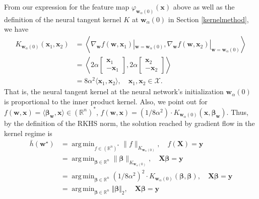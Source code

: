 \documentclass{article}
\DeclareMathOperator*{\argmin}{arg\,min}
\begin{document}
From our expression for the feature map $\varphi_{\boldsymbol{w}_{\alpha}(0)}(\boldsymbol{x})$ above as well as the definition of the neural tangent kernel $K$ at $\boldsymbol{w}_{\alpha}(0)$ in Section \ref{kernelmethod}, we have
\begin{align*}
K_{\boldsymbol{w}_{\alpha}(0)}(\boldsymbol{x}_1, \boldsymbol{x}_2) &= \left\langle \nabla_{\boldsymbol{w}}f(\boldsymbol{w}, \boldsymbol{x}_1)|_{\boldsymbol{w} = \boldsymbol{w}_{\alpha}(0)}, \nabla_{\boldsymbol{w}}f(\boldsymbol{w}, \boldsymbol{x}_2)|_{\boldsymbol{w} = \boldsymbol{w}_{\alpha}(0)} \right\rangle\\
&= \left\langle 2\alpha 
    \begin{bmatrix}
        \boldsymbol{x}_1\\
        -\boldsymbol{x}_1
    \end{bmatrix}, 2\alpha 
    \begin{bmatrix}
        \boldsymbol{x}_2\\
        -\boldsymbol{x}_2
    \end{bmatrix} \right\rangle\\
&= 8\alpha^2 \langle \boldsymbol{x}_1, \boldsymbol{x}_2 \rangle, \quad \boldsymbol{x}_1, \boldsymbol{x}_2 \in \mathcal{X}.
\end{align*}
That is, the neural tangent kernel at the neural network's initialization $\boldsymbol{w}_{\alpha}(0)$ is proportional to the inner product kernel. Also, we point out for $f(\boldsymbol{w}, \boldsymbol{x}) = \langle \boldsymbol{\beta}_{\boldsymbol{w}}, \boldsymbol{x} \rangle \in (\mathbb{R}^n)^*$, $f(\boldsymbol{w}, \boldsymbol{x}) =  (1/8\alpha^2)\cdot K_{\boldsymbol{w}_{\alpha}(0)}(\boldsymbol{x},\boldsymbol{\beta}_{\boldsymbol{w}})$. Thus, by the definition of the RKHS norm, the solution reached by gradient flow in the kernel regime is
\begin{align*}
    \bar{h}(\boldsymbol{w}^{\star}) &= \argmin_{f \in (\mathbb{R}^n)^*} \| f \|_{K_{\boldsymbol{w}_{\alpha}(0)}},\quad f(\boldsymbol{X}) = \boldsymbol{y}\\
    &= \argmin_{\boldsymbol{\beta} \in \mathbb{R}^n} \| \boldsymbol{\beta} \|_{K_{\boldsymbol{w}_{\alpha}(0)} },\quad \boldsymbol{X}\boldsymbol{\beta} = \boldsymbol{y}\\
    &= \argmin_{\boldsymbol{\beta} \in \mathbb{R}^n} (1/8\alpha^2)^2\cdot K_{\boldsymbol{w}_{\alpha}(0)}(\boldsymbol{\beta},\boldsymbol{\beta}), \quad \boldsymbol{X}\boldsymbol{\beta} = \boldsymbol{y}\\
    &= \argmin_{\boldsymbol{\beta} \in \mathbb{R}^n} \Vert \boldsymbol{\beta} \Vert_2, \quad \boldsymbol{X}\boldsymbol{\beta} = \boldsymbol{y}
\end{align*}
\end{document}

